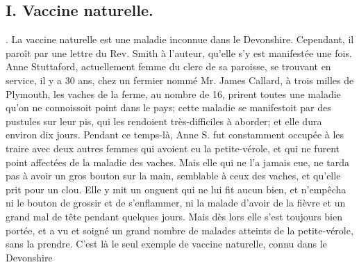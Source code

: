 \subsection{I. Vaccine naturelle.}
. La vaccine naturelle est une maladie inconnue dans le Devonshire. Cependant, il paroît par une lettre du Rev. Smith à l'auteur, qu'elle s'y est manifestée une fois. Anne Stuttaford, actuellement femme du clerc de sa paroisse, se trouvant en service, il y a 30 ans, chez un fermier nommé Mr.\setcounter{page}{376} James Callard, à trois milles de Plymouth, les vaches de la ferme, au nombre de 16, prirent toutes une maladie qu'on ne connoissoit point dans le pays; cette maladie se manifestoit par des pustules sur leur pis, qui les rendoient très-difficiles à aborder; et elle dura environ dix jours. Pendant ce temps-là, Anne S. fut constamment occupée à les traire avec deux autres femmes qui avoient eu la petite-vérole, et qui ne furent point affectées de la maladie des vaches. Mais elle qui ne l'a jamais eue, ne tarda pas à avoir un gros bouton sur la main, semblable à ceux des vaches, et qu'elle prit pour un clou. Elle y mit un onguent qui ne lui fit aucun bien, et n'empêcha ni le bouton de grossir et de s'enflammer, ni la malade d'avoir de la fièvre et un grand mal de tête pendant quelques jours. Mais dès lors elle s'est toujours bien portée, et a vu et soigné un grand nombre de malades atteints de la petite-vérole, sans la prendre.
C'est là le seul exemple de vaccine naturelle, connu dans le Devonshire
